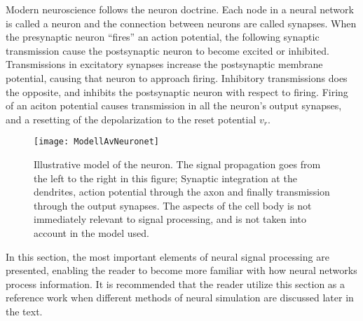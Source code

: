 	Modern neuroscience follows the neuron doctrine. 
	Each node in a neural network is called a neuron and the connection between neurons are called synapses.
	When the presynaptic neuron ``fires'' an action potential, the following synaptic transmission cause the postsynaptic neuron to become excited or inhibited.
	Transmissions in excitatory synapses increase the postsynaptic membrane potential, causing that neuron to approach firing. %
	Inhibitory transmissions does the opposite, and inhibits the postsynaptic neuron with respect to firing.
	Firing of an aciton potential causes transmission in all the neuron's output synapses, and a resetting of the depolarization to the reset potential $v_r$. %
	\cite{PrinciplesOfNeuralScience4edKAP02}


\begin{figure}[hbt!p]
	\centering
	\texttt{[image: ModellAvNeuronet]}
	\caption[Illustrative model of the neuron]{Illustrative model of the neuron. The signal propagation goes from the left to the right in this figure;
			Synaptic integration at the dendrites, action potential through the axon and finally transmission through the output synapses. 
			The aspects of the cell body is not immediately relevant to signal processing, and is not taken into account in the model used. }
	\label{figFigurAvNeuronet}
\end{figure}
	
	In this section, the most important elements of neural signal processing are presented, enabling the reader to become more familiar with how neural networks process information.
	It is recommended that the reader utilize this section as a reference work when different methods of neural simulation are discussed later in the text. %




